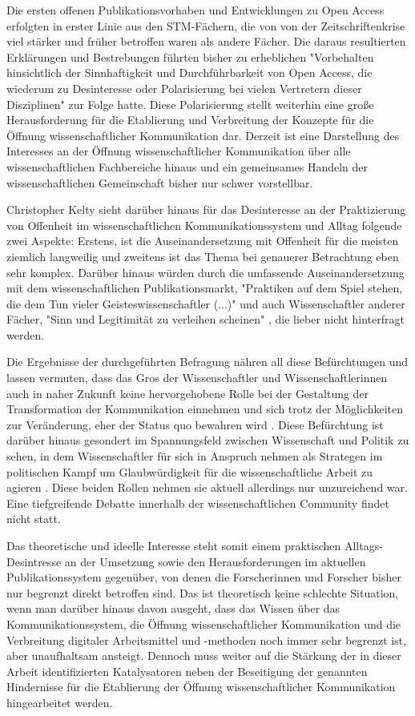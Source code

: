 Die ersten offenen Publikationsvorhaben und Entwicklungen zu Open Access erfolgten in erster Linie aus den STM-Fächern, die von von der Zeitschriftenkrise viel stärker und früher betroffen waren als andere Fächer. Die daraus resultierten Erklärungen und Bestrebungen führten bisher zu erheblichen "Vorbehalten hinsichtlich der Sinnhaftigkeit und Durchführbarkeit von Open Access, die wiederum zu Desinteresse oder Polarisierung bei vielen Vertretern dieser Disziplinen" \cite{naeder_2010_open} zur Folge hatte. Diese Polarisierung stellt weiterhin eine große Herausforderung für die Etablierung und Verbreitung der Konzepte für die Öffnung wissenschaftlicher Kommunikation dar. Derzeit ist eine Darstellung des Interesses an der Öffnung wissenschaftlicher Kommunikation über alle wissenschaftlichen Fachbereiche hinaus und ein gemeinsames Handeln der wissenschaftlichen Gemeinschaft bisher nur schwer vorstellbar.

Christopher Kelty sieht darüber hinaus für das Desinteresse an der Praktizierung von Offenheit im wissenschaftlichen Kommunikationssystem und Alltag folgende zwei Aspekte: Erstens, ist die Auseinandersetzung mit Offenheit für die meisten ziemlich langweilig und zweitens ist das Thema bei genauerer Betrachtung eben sehr komplex. Darüber hinaus würden durch die umfassende Auseinandersetzung mit dem wissenschaftlichen Publikationsmarkt, "Praktiken auf dem Spiel stehen, die dem Tun vieler Geisteswissenschaftler (...)" und auch Wissenschaftler anderer Fächer, "Sinn und Legitimität zu verleihen scheinen" \cite{Hirschi_2015_buch_oa}, die lieber nicht hinterfragt werden.

Die Ergebnisse der durchgeführten Befragung nähren all diese Befürchtungen und lassen vermuten, dass das Gros der Wissenschaftler und Wissenschaftlerinnen auch in naher Zukunft keine hervorgehobene Rolle bei der Gestaltung der Transformation der Kommunikation einnehmen und sich trotz der Möglichkeiten zur Veränderung, eher der Status quo bewahren wird \cite{nosek_2012_scientific}. Diese Befürchtung ist darüber hinaus gesondert im Spannungsfeld zwischen Wissenschaft und Politik zu sehen, in dem Wissenschaftler für sich in Anspruch nehmen als Strategen im politischen Kampf um Glaubwürdigkeit für die wissenschaftliche Arbeit zu agieren \cite{latour_2013_laboratory}. Diese beiden Rollen nehmen sie aktuell allerdings nur unzureichend war. Eine tiefgreifende Debatte innerhalb der wissenschaftlichen Community findet nicht statt.

Das theoretische und ideelle Interesse steht somit einem praktischen Alltags-Desintresse an der Umsetzung sowie den Herausforderungen im aktuellen Publikationssystem gegenüber, von denen die Forscherinnen und Forscher bisher nur begrenzt direkt betroffen sind. Das ist theoretisch keine schlechte Situation, wenn man darüber hinaus davon ausgeht, dass das Wissen über das Kommunikationssystem, die Öffnung wissenschaftlicher Kommunikation und die Verbreitung digitaler Arbeitsmittel und -methoden noch immer sehr begrenzt ist, aber unaufhaltsam ansteigt. Dennoch muss weiter auf die Stärkung der in dieser Arbeit identifizierten Katalysatoren neben der Beseitigung der genannten Hindernisse für die Etablierung der Öffnung wissenschaftlicher Kommunikation hingearbeitet werden.

